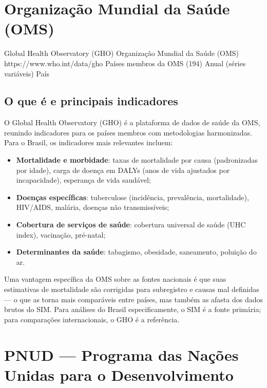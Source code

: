 \section{Organização Mundial da Saúde (OMS)}

\ficharapida
  {Global Health Observatory (GHO)}
  {Organização Mundial da Saúde (OMS)}
  {https://www.who.int/data/gho}
  {Países membros da OMS (194)}
  {Anual (séries variáveis)}
  {País}

\subsection{O que é e principais indicadores}

O Global Health Observatory (GHO) é a plataforma de dados de saúde da OMS, reunindo indicadores para os países membros com metodologias harmonizadas. Para o Brasil, os indicadores mais relevantes incluem:

\begin{itemize}
  \item \textbf{Mortalidade e morbidade}: taxas de mortalidade por causa (padronizadas por idade), carga de doença em DALYs (anos de vida ajustados por incapacidade), esperança de vida saudável;
  \item \textbf{Doenças específicas}: tuberculose (incidência, prevalência, mortalidade), HIV/AIDS, malária, doenças não transmissíveis;
  \item \textbf{Cobertura de serviços de saúde}: cobertura universal de saúde (UHC index), vacinação, pré-natal;
  \item \textbf{Determinantes da saúde}: tabagismo, obesidade, saneamento, poluição do ar.
\end{itemize}

Uma vantagem específica da OMS sobre as fontes nacionais é que suas estimativas de mortalidade são corrigidas para subregistro e causas mal definidas --- o que as torna mais comparáveis entre países, mas também as afasta dos dados brutos do SIM. Para análises do Brasil especificamente, o SIM é a fonte primária; para comparações internacionais, o GHO é a referência.

\section{PNUD --- Programa das Nações Unidas para o Desenvolvimento}

